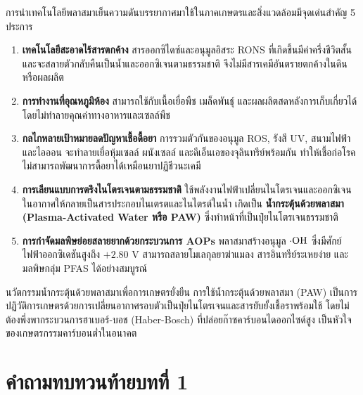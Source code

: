 การนำเทคโนโลยีพลาสมาเย็นความดันบรรยากาศมาใช้ในภาคเกษตรและสิ่งแวดล้อมมีจุดเด่นสำคัญ 5 ประการ

\begin{enumerate}
    \item \textbf{เทคโนโลยีสะอาดไร้สารตกค้าง} สารออกซิไดซ์และอนุมูลอิสระ RONS ที่เกิดขึ้นมีค่าครึ่งชีวิตสั้นและจะสลายตัวกลับคืนเป็นน้ำและออกซิเจนตามธรรมชาติ จึงไม่มีสารเคมีอันตรายตกค้างในดินหรือผลผลิต
    \item \textbf{การทำงานที่อุณหภูมิห้อง} สามารถใช้กับเนื้อเยื่อพืช เมล็ดพันธุ์ และผลผลิตสดหลังการเก็บเกี่ยวได้โดยไม่ทำลายคุณค่าทางอาหารและเซลล์พืช
    \item \textbf{กลไกหลายเป้าหมายลดปัญหาเชื้อดื้อยา} การรวมตัวกันของอนุมูล ROS, รังสี UV, สนามไฟฟ้า และไอออน จะทำลายเยื่อหุ้มเซลล์ ผนังเซลล์ และดีเอ็นเอของจุลินทรีย์พร้อมกัน ทำให้เชื้อก่อโรคไม่สามารถพัฒนาการดื้อยาได้เหมือนยาปฏิชีวนะเคมี
    \item \textbf{การเลียนแบบการตรึงไนโตรเจนตามธรรมชาติ} ใช้พลังงานไฟฟ้าเปลี่ยนไนโตรเจนและออกซิเจนในอากาศให้กลายเป็นสารประกอบไนเตรตและไนไตรต์ในน้ำ เกิดเป็น \textbf{น้ำกระตุ้นด้วยพลาสมา (Plasma-Activated Water หรือ PAW)} ซึ่งทำหน้าที่เป็นปุ๋ยไนโตรเจนธรรมชาติ
    \item \textbf{การกำจัดมลพิษย่อยสลายยากด้วยกระบวนการ AOPs} พลาสมาสร้างอนุมูล $\cdot\ce{OH}$ ซึ่งมีศักย์ไฟฟ้าออกซิเดชันสูงถึง $+2.80\text{ V}$ สามารถสลายโมเลกุลยาฆ่าแมลง สารอินทรีย์ระเหยง่าย และมลพิษกลุ่ม PFAS ได้อย่างสมบูรณ์
\end{enumerate}

\begin{agribox}{นวัตกรรมน้ำกระตุ้นด้วยพลาสมาเพื่อการเกษตรยั่งยืน}
การใช้น้ำกระตุ้นด้วยพลาสมา (PAW) เป็นการปฏิวัติการเกษตรด้วยการเปลี่ยนอากาศรอบตัวเป็นปุ๋ยไนโตรเจนและสารยับยั้งเชื้อราพร้อมใช้ โดยไม่ต้องพึ่งพากระบวนการฮาเบอร์-บอช (Haber-Bosch) ที่ปล่อยก๊าซคาร์บอนไดออกไซด์สูง เป็นหัวใจของเกษตรกรรมคาร์บอนต่ำในอนาคต
\end{agribox}

\clearpage


\section*{คำถามทบทวนท้ายบทที่ 1}

